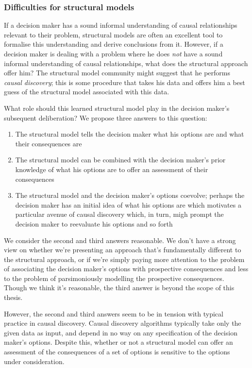 \subsubsection{Difficulties for structural models}

If a decision maker has a sound informal understanding of causal relationships relevant to their problem, structural models are often an excellent tool to formalise this understanding and derive conclusions from it. However, if a decision maker is dealing with a problem where he does \emph{not} have a sound informal understanding of causal relationships, what does the structural approach offer him? The structural model community might suggest that he performs \emph{causal discovery}; this is some procedure that takes his data and offers him a best guess of the structural model associated with this data.

What role should this learned structural model play in the decision maker's subsequent deliberation? We propose three answers to this question:
\begin{enumerate}
    \item The structural model tells the decision maker what his options are and what their consequences are
    \item The structural model can be combined with the decision maker's prior knowledge of what his options are to offer an assessment of their consequences
    \item The structural model and the decision maker's options coevolve; perhaps the decision maker has an initial idea of what his options are which motivates a particular avenue of causal discovery which, in turn, migh prompt the decision maker to reevaluate his options and so forth
\end{enumerate}

We consider the second and third answers reasonable. We don't have a strong view on whether we're presenting an approach that's fundamentally different to the structural approach, or if we're simply paying more attention to the problem of associating the decision maker's options with prospective consequences and less to the problem of parsimoniously modelling the prospective consequences. Though we think it's reasonable, the third answer is beyond the scope of this thesis.

However, the second and third answers seem to be in tension with typical practice in causal discovery. Causal discovery algorithms typically take only the given data as input, and depend in no way on any specification of the decision maker's options. Despite this, whether or not a structural model can offer an assessment of the consequences of a set of options is sensitive to the options under consideration.

